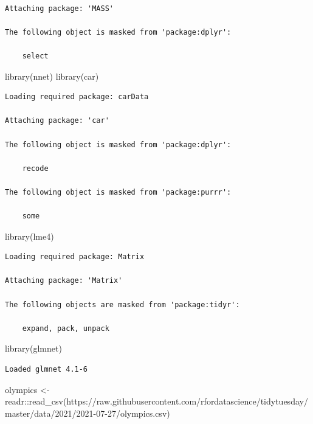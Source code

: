 \documentclass[
  letterpaper,
  DIV=11,
  numbers=noendperiod]{scrartcl}
\newenvironment{Shaded}{\begin{snugshade}}{\end{snugshade}}
\newcommand{\FunctionTok}[1]{\textcolor[rgb]{0.28,0.35,0.67}{#1}}
\newcommand{\NormalTok}[1]{\textcolor[rgb]{0.00,0.23,0.31}{#1}}
\newcommand{\OtherTok}[1]{\textcolor[rgb]{0.00,0.23,0.31}{#1}}
\newcommand{\SpecialCharTok}[1]{\textcolor[rgb]{0.37,0.37,0.37}{#1}}
\newcommand{\StringTok}[1]{\textcolor[rgb]{0.13,0.47,0.30}{#1}}
\begin{document}
\begin{verbatim}

Attaching package: 'MASS'

The following object is masked from 'package:dplyr':

    select
\end{verbatim}

\begin{Shaded}
\begin{Highlighting}[]
\FunctionTok{library}\NormalTok{(nnet)}
\FunctionTok{library}\NormalTok{(car)}
\end{Highlighting}
\end{Shaded}

\begin{verbatim}
Loading required package: carData

Attaching package: 'car'

The following object is masked from 'package:dplyr':

    recode

The following object is masked from 'package:purrr':

    some
\end{verbatim}

\begin{Shaded}
\begin{Highlighting}[]
\FunctionTok{library}\NormalTok{(lme4)}
\end{Highlighting}
\end{Shaded}

\begin{verbatim}
Loading required package: Matrix

Attaching package: 'Matrix'

The following objects are masked from 'package:tidyr':

    expand, pack, unpack
\end{verbatim}

\begin{Shaded}
\begin{Highlighting}[]
\FunctionTok{library}\NormalTok{(glmnet)}
\end{Highlighting}
\end{Shaded}

\begin{verbatim}
Loaded glmnet 4.1-6
\end{verbatim}

\begin{Shaded}
\begin{Highlighting}[]
\NormalTok{olympics }\OtherTok{\textless{}{-}}\NormalTok{ readr}\SpecialCharTok{::}\FunctionTok{read\_csv}\NormalTok{(}\StringTok{\textquotesingle{}https://raw.githubusercontent.com/rfordatascience/tidytuesday/master/data/2021/2021{-}07{-}27/olympics.csv\textquotesingle{}}\NormalTok{)}
\end{Highlighting}
\end{Shaded}
\end{document}
